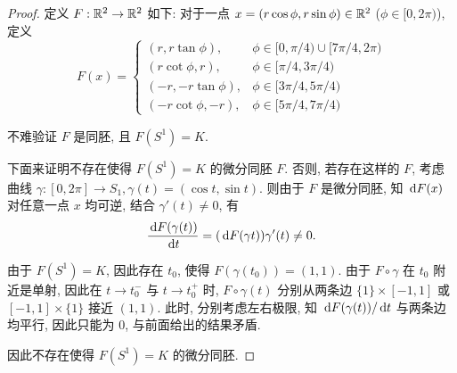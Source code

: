 \documentclass{article}
\begin{document}
\begin{proof}
	定义 $F: \mathbb{R}^2 \to \mathbb{R}^2$ 如下: 对于一点 $x=(r\cos \phi, r\sin\phi) \in \mathbb{R}^2$ ($\phi \in [0,2\pi)$), 定义
	\[ F(x) = \begin{cases}
		(r,r\tan\phi), & \phi \in [0,\pi/4) \cup [7\pi/4, 2\pi) \\
		(r\cot\phi, r), & \phi \in [\pi/4,3\pi/4) \\
		(-r, -r\tan\phi), & \phi \in [3\pi/4, 5\pi/4) \\
		(-r\cot\phi, -r), & \phi \in [5\pi/4, 7\pi/4)
	\end{cases} \]

	不难验证 $F$ 是同胚, 且 $F(S^1) = K$. 

	下面来证明不存在使得 $F(S^1) = K$ 的微分同胚 $F$. 否则, 若存在这样的 $F$, 考虑曲线 $\gamma: [0,2\pi] \to S_1, \gamma(t) = (\cos t, \sin t)$. 则由于 $F$ 是微分同胚, 知 $\,\mathrm{d} F(x)$ 对任意一点 $x$ 均可逆, 结合 $\gamma'(t) \neq 0$, 有
	\[ \frac{\,\mathrm{d} F(\gamma(t))}{\,\mathrm{d} t} = (\,\mathrm{d} F (\gamma t))\gamma'(t) \neq 0.  \]

	由于 $F(S^1) = K$, 因此存在 $t_0$, 使得 $F(\gamma(t_0)) = (1,1)$. 由于 $F \circ \gamma$ 在 $t_0$ 附近是单射, 因此在 $t \to t_0^-$ 与 $t \to t_0^+$ 时, $F\circ \gamma(t)$ 分别从两条边 $\{1\}\times [-1,1]$ 或 $[-1,1] \times \{1\}$ 接近 $(1,1)$. 此时, 分别考虑左右极限, 知 $\,\mathrm{d} F(\gamma(t))/\,\mathrm{d} t$ 与两条边均平行, 因此只能为 $0$, 与前面给出的结果矛盾.

	因此不存在使得 $F(S^1) = K$ 的微分同胚.
\end{proof}
\end{document}
